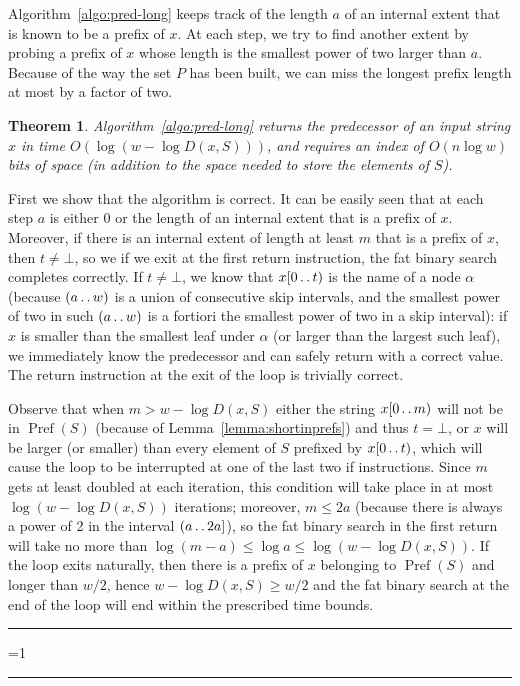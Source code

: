 \documentclass{article}
\newtheorem{theorem}{Theorem}
\newcounter{noqed}
\newcommand{\qed}{ \ifmmode\mbox{ }\fi\rule[-.05em]{.3em}{.7em}\setcounter{noqed}{0}}
\newenvironment{proof}[1][{}]{\noindent{\bf Proof#1. }\setcounter{noqed}{1}}{\ifnum\value{noqed}=1\qed\fi\par\medskip}
\newcommand{\Pref}[1]{\operatorname{Pref}(#1)}
\newcommand{\?}{\mskip1.5mu}
\def\..{\,\mathpunct{\ldotp\ldotp}} %
\begin{document}
Algorithm~\ref{algo:pred-long} keeps track of the length $a$ of an
internal extent that is known to be a prefix of $x$. At each step, we try to
find another extent by probing a prefix of $x$ whose length is the smallest power of two larger than
$a$. Because of the way the set $P$ has been built, we can miss the longest
prefix length at most by a factor of two. 

\begin{theorem}	
\label{thm:pred-long}
Algorithm~\ref{algo:pred-long} returns the predecessor of an input string $x$
in time $O(\log(w-\log D(x,S)))$, and requires an index of $O(n \log w)$ bits of space (in addition to the space needed to store the elements of $S$).
\end{theorem}
\begin{proof}
First we show that the algorithm is correct. It can be easily seen that at each
step $a$ is either 0 or the length of an internal extent that is a prefix of
$x$. Moreover, if there is an internal extent of length at least $m$ that is
a prefix of $x$, then $t\neq\bot$, so we if we exit at the first return
instruction, the fat binary search completes correctly. If $t\neq \bot$,
we know that $x[0\..t)$ is the name of a node $\alpha$
(because $(a\..w)$ is a union of consecutive skip intervals, and the smallest power of two in such $(a\..w)$ is
a fortiori the smallest power of two in a skip interval): if  
$x$ is smaller than the smallest leaf
under $\alpha$ (or larger than the largest such leaf), we immediately know the
predecessor and can safely return with a correct value. The return instruction
at the exit of the loop is trivially correct.

Observe that when $m>w-\log D(x,S)$
either the string $x[0\..m)$ will not be in $\Pref S$ (because of
Lemma~\ref{lemma:shortinprefs}) and thus $t=\bot$, or $x$ will be larger (or
smaller) than every element of $S$ prefixed by $x[0\..t)$, which will cause the
loop to be interrupted at one of the last two if instructions. 
Since $m$ gets at
least doubled at each iteration, this condition will take place in at most $\log(w-\log D(x,S))$ iterations; moreover, $m\leq 2a$ (because there is always a power of 2 in the interval $(a\..2a]$), so the fat binary search in the first
return will take no more than $\log(m-a)\leq \log a\leq \log (w-\log D(x,S))$.
If the loop exits naturally, then there is a prefix of $x$ belonging to $\Pref
S$ and longer than $w/2$, hence $w-\log D(x,S)\geq w/2$ and the fat binary
search at the end of the loop will end within the prescribed time bounds.\qed
\end{proof}
\end{document}
